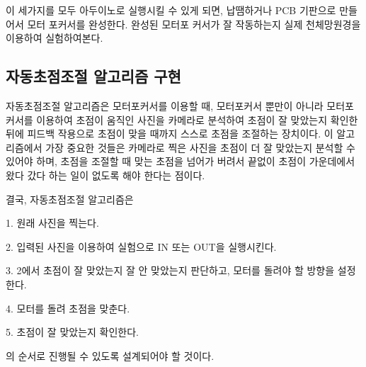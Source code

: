 이 세가지를 모두 아두이노로 실행시킬 수 있게 되면, 납땜하거나 PCB 기판으로 만들어서 모터 포커서를 완성한다. 완성된 모터포 커서가 잘 작동하는지 실제 천체망원경을 이용하여 실험하여본다.



\subsection{자동초점조절 알고리즘 구현}



자동초점조절 알고리즘은 모터포커서를 이용할 때, 모터포커서 뿐만이 아니라 모터포커서를 이용하여 초점이 움직인 사진을 카메라로 분석하여 초점이 잘 맞았는지 확인한 뒤에 피드백 작용으로 초점이 맞을 때까지 스스로 초점을 조절하는 장치이다. 이 알고리즘에서 가장 중요한 것들은 카메라로 찍은 사진을 초점이 더 잘 맞았는지 분석할 수 있어야 하며, 초점을 조절할 때 맞는 초점을 넘어가 버려서 끝없이 초점이 가운데에서 왔다 갔다 하는 일이 없도록 해야 한다는 점이다.

결국, 자동초점조절 알고리즘은

1. 원래 사진을 찍는다.

2. 입력된 사진을 이용하여 실험으로 IN 또는 OUT을 실행시킨다.

3. 2에서 초점이 잘 맞았는지 잘 안 맞았는지 판단하고, 모터를 돌려야 할 방향을 설정한다. 

4. 모터를 돌려 초점을 맞춘다.

5. 초점이 잘 맞았는지 확인한다.

의 순서로 진행될 수 있도록 설계되어야 할 것이다.

